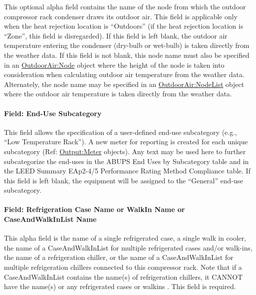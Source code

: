 This optional alpha field contains the name of the node from which the outdoor compressor rack condenser draws its outdoor air. This field is applicable only when the heat rejection location is ``Outdoors'' (if the heat rejection location is ``Zone'', this field is disregarded). If this field is left blank, the outdoor air temperature entering the condenser (dry-bulb or wet-bulb) is taken directly from the weather data. If this field is not blank, this node name must also be specified in an \hyperref[outdoorairnode]{OutdoorAir:Node} object where the height of the node is taken into consideration when calculating outdoor air temperature from the weather data. Alternately, the node name may be specified in an \hyperref[outdoorairnodelist]{OutdoorAir:NodeList} object where the outdoor air temperature is taken directly from the weather data.

\paragraph{Field: End-Use Subcategory}\label{field-end-use-subcategory-003}

This field allows the specification of a user-defined end-use subcategory (e.g., ``Low Temperature Rack''). A new meter for reporting is created for each unique subcategory (Ref: \hyperref[outputmeter-and-outputmetermeterfileonly]{Output:Meter} objects). Any text may be used here to further subcategorize the end-uses in the ABUPS End Uses by Subcategory table and in the LEED Summary EAp2-4/5 Performance Rating Method Compliance table.  If this field is left blank, the equipment will be assigned to the ``General'' end-use subcategory.

\paragraph{Field: Refrigeration Case Name or WalkIn Name or CaseAndWalkInList Name}\label{field-refrigeration-case-name-or-walkin-name-or-caseandwalkinlist-name}

This alpha field is the name of a single refrigerated case, a single walk in cooler,~ the name of a CaseAndWalkInList for multiple refrigerated cases and/or walk-ins, the name of a refrigeration chiller, or the name of a CaseAndWalkInList for multiple refrigeration chillers connected to this compressor rack. Note that if a CaseAndWalkInList contains the name(s) of refrigeration chillers, it CANNOT have the name(s) or any refrigerated cases or walkins . This field is required.


